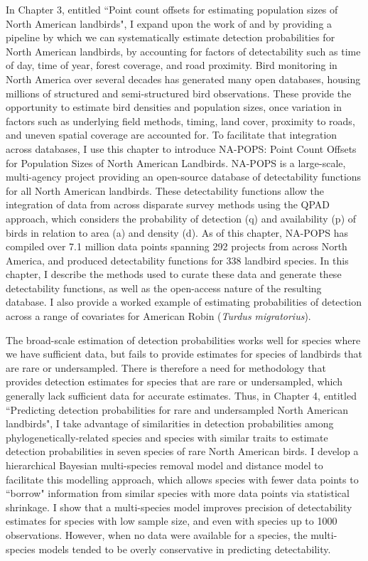 \par In Chapter 3, entitled ``Point count offsets for estimating population sizes of North American landbirds", I expand upon the work of \citet{solymos_calibrating_2013} and \citet{solymos_evaluating_2018} by providing a pipeline by which we can systematically estimate detection probabilities for North American landbirds, by accounting for factors of detectability such as time of day, time of year, forest coverage, and road proximity.
Bird monitoring in North America over several decades has generated many open databases, housing millions of structured and semi-structured bird observations. 
These provide the opportunity to estimate bird densities and population sizes, once variation in factors such as underlying field methods, timing, land cover, proximity to roads, and uneven spatial coverage are accounted for. 
To facilitate that integration across databases, I use this chapter to introduce NA-POPS: Point Count Offsets for Population Sizes of North American Landbirds. 
NA-POPS is a large-scale, multi-agency project providing an open-source database of detectability functions for all North American landbirds. 
These detectability functions allow the integration of data from across disparate survey methods using the QPAD approach, which considers the probability of detection (q) and availability (p) of birds in relation to area (a) and density (d). 
As of this chapter, NA-POPS has compiled over 7.1 million data points spanning 292 projects from across North America, and produced detectability functions for 338 landbird species. 
In this chapter, I describe the methods used to curate these data and generate these detectability functions, as well as the open-access nature of the resulting database. 
I also provide a worked example of estimating probabilities of detection across a range of covariates for American Robin (\textit{Turdus migratorius}).


\par The broad-scale estimation of detection probabilities works well for species where we have sufficient data, but fails to provide estimates for species of landbirds that are rare or undersampled.
There is therefore a need for methodology that provides detection estimates for species that are rare or undersampled, which generally lack sufficient data for accurate estimates. 
Thus, in Chapter 4, entitled ``Predicting detection probabilities for rare and undersampled North American landbirds", I take advantage of similarities in detection probabilities among phylogenetically-related species and species with similar traits to estimate detection probabilities in seven species of rare North American birds.
I develop a hierarchical Bayesian multi-species removal model and distance model to facilitate this modelling approach, which allows species with fewer data points to ``borrow" information from similar species with more data points via statistical shrinkage. 
I show that a multi-species model improves precision of detectability estimates for species with low sample size, and even with species up to 1000 observations.
However, when no data were available for a species, the multi-species models tended to be overly conservative in predicting detectability. 

